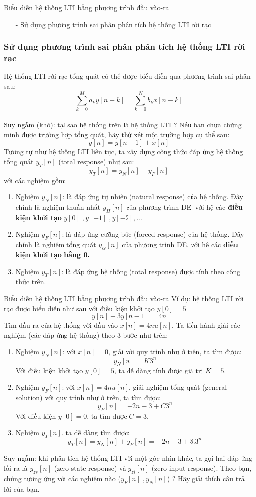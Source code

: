 \documentclass[8pt]{beamer}
\begin{document}
\begin{frame}{Biểu diễn hệ thống LTI bằng phương trình đầu vào-ra}
\begin{itemize}
\item[-] Sử dụng phương trình sai phân phân tích hệ thống LTI rời rạc
\end{itemize}
\subsubsection{Sử dụng phương trình sai phân phân tích hệ thống LTI rời rạc}
 Hệ thống LTI rời rạc tổng quát có thể được biểu diễn qua phương trình sai phân sau:
$$\sum_{k=0}^{M}a_{k}y[n-k]=\sum_{k=0}^{N}b_{k}x[n-k]$$
\\ Suy ngẫm (khó): tại sao hệ thống trên là hệ thống LTI ? Nếu bạn chưa chứng minh được trường hợp tổng quát, hãy thử xét một trường hợp cụ thể sau: 
$$y[n]=y[n-1]+x[n]$$
Tương tự như hệ thống LTI liên tục, ta xây dựng công thức đáp ứng hệ thống tổng quát $y_{T}[n]$ (total response) như sau: $$y_{T}[n]=y_{N}[n]+y_{F}[n]$$
với các nghiệm gồm:
\begin{enumerate}
	\item Nghiệm $y_{N}[n]$: là đáp ứng tự nhiên (natural response) của hệ thống. Đây chính là \alert{nghiệm thuần nhất $y_{H}[n]$} của phương trình DE, với hệ các \textbf{điều kiện khởi tạo $y[0]\; ,y[-1]\; ,y[-2],...$}
	\item Nghiệm $y_{F}[n]$: là đáp ứng cưỡng bức (forced response) của hệ thống. Đây chính là \alert{nghiệm tổng quát $y_{G}[n]$} của phương trình DE, với hệ các \textbf{điều kiện khởi tạo bằng 0.}
	\item Nghiệm $y_{T}[n]$: là đáp ứng hệ thống (total response) được tính theo công thức trên.
\end{enumerate}
\end{frame}
\begin{frame}{Biểu diễn hệ thống LTI bằng phương trình đầu vào-ra}
Ví dụ: hệ thống LTI rời rạc được biểu diễn như sau với điều kiện khởi tạo $y[0]=5$
$$y[n]-3y[n-1]=4n$$
Tìm đầu ra của hệ thống với đầu vào $x[n]=4nu[n]$.
Ta tiến hành giải các nghiệm (các đáp ứng hệ thống) theo 3 bước như trên:
\begin{enumerate}
	\item Nghiệm $y_{N}[n]$: với \alert{$x[n]=0$}, giải với quy trình như ở trên, ta tìm được: $$y_{N}[n]=K3^{n}$$
		Với điều kiện khởi tạo $y[0]=5$, ta dễ dàng tính được giá trị $K=5$.
	\item Nghiệm $y_{F}[n]$: với $x[n]=4nu[n]$, giải nghiệm tổng quát (general solution) với quy trình như ở trên, ta tìm được:
		$$y_{F}[n]=-2n-3+C3^n$$
	Với điều kiện \alert{$y[0]=0$}, ta tìm được $C=3$.
\item Nghiệm $y_{T}[n]$, ta dễ dàng tìm được:
	$$y_{T}[n]=y_{N}[n]+y_{F}[n]=-2n-3+8.3^n$$
\end{enumerate}
	Suy ngẫm: khi phân tích hệ thống LTI với một góc nhìn khác, ta gọi hai đáp ứng lối ra là $y_{zs}[n]$ (zero-state response) và $y_{zi}[n]$ (zero-input response). Theo bạn, chúng tương ứng với các nghiệm nào ($y_{F}[n]\; ,y_{N}[n]$) ? Hãy giải thích câu trả lời của bạn. 
\end{frame}
\end{document}
